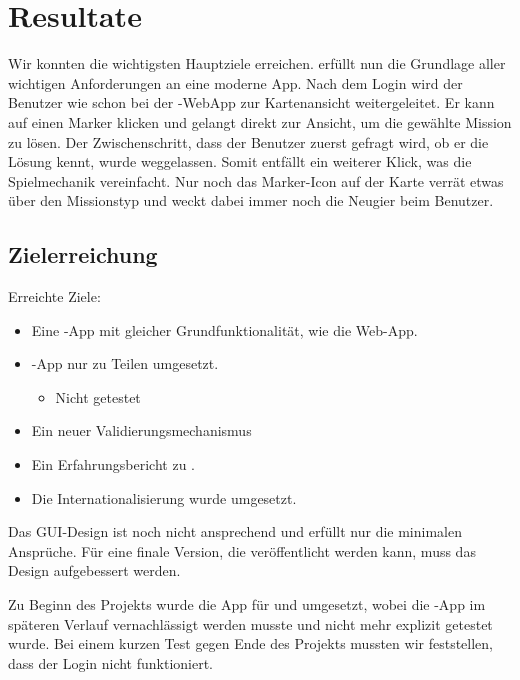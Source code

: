\chapter{Resultate}
\label{tb-resultate}

Wir konnten die wichtigsten Hauptziele erreichen.
\kort{} erfüllt nun die Grundlage aller wichtigen Anforderungen an eine moderne App.
Nach dem Login wird der Benutzer wie schon bei der \kort{}-\gls{WebApp} zur Kartenansicht weitergeleitet.
Er kann auf einen Marker klicken und gelangt direkt zur Ansicht, um die gewählte Mission zu lösen.
Der Zwischenschritt, dass der Benutzer zuerst gefragt wird, ob er die Lösung kennt, wurde weggelassen.
Somit entfällt ein weiterer Klick, was die Spielmechanik vereinfacht.
Nur noch das Marker-Icon auf der Karte verrät etwas über den Missionstyp und weckt dabei immer noch die Neugier beim Benutzer.


\section{Zielerreichung}

Erreichte Ziele:
\begin{itemize}
	\item Eine -App mit gleicher Grundfunktionalität, wie die Web-App.
	\item {}-App nur zu Teilen umgesetzt.
	\begin{itemize}
		\item Nicht getestet
	\end{itemize}
	\item Ein neuer Validierungsmechanismus
	\item Ein Erfahrungsbericht zu .
	\item Die Internationalisierung wurde umgesetzt.
\end{itemize}

Das \gls{GUI}-Design ist noch nicht ansprechend und erfüllt nur die minimalen Ansprüche.
Für eine finale Version, die veröffentlicht werden kann, muss das Design aufgebessert werden.

Zu Beginn des Projekts wurde die App für  und  umgesetzt, wobei die -App im späteren Verlauf vernachlässigt werden musste und nicht mehr explizit getestet wurde.
Bei einem kurzen Test gegen Ende des Projekts mussten wir feststellen, dass der  Login nicht funktioniert.


